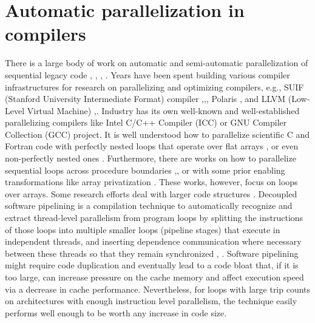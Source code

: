 \section{Automatic parallelization in compilers}
\label{related_work_autopar}
\quad There is a large body of work on automatic and semi-automatic parallelization of sequential legacy code \cite{6813266}, \cite{article12345}, \cite{Bacon:1994:CTH:197405.197406}, \cite{Kennedy:2001:OCM:502981}. Years have been spent building various compiler infrastructures for research on parallelizing \cite{Kennedy:2001:OCM:502981} and optimizing \cite{Muchnick:1998:ACD:286076} compilers, e.g., SUIF (Stanford University Intermediate Format) compiler \cite{546613},\cite{10.5555/891422},\cite{suif_compiler}, Polaris \cite{polaris}, \cite{10.1109/M-PDT.1994.329796} and LLVM (Low-Level Virtual Machine) \cite{llvm-compiler-infrastructure},\cite{Lattner:2004:LCF:977395.977673}. Industry has its own well-known and well-established parallelizing compilers like Intel C/C++ Compiler (ICC) \cite{icc-compiler} or GNU Compiler Collection (GCC) project.\newline\null
\quad It is well understood how to parallelize scientific C and Fortran code with perfectly nested loops that operate over flat arrays \cite{97902}, or even non-perfectly nested ones \cite{10.1145/263699.263719}. Furthermore, there are works on how to parallelize sequential loops across procedure boundaries \cite{10.1145/125826.126055},\cite{10.5555/645671.665383}, or with some prior enabling transformations like array privatization \cite{10.1145/158511.158515}. These works, however, focus on loops over arrays. Some research efforts deal with larger code structures
\cite{1299188}. Decoupled software pipelining is a compilation technique to automatically recognize and extract thread-level parallelism from program loops by splitting the instructions of those loops into multiple smaller loops (pipeline stages) that execute in independent threads, and inserting dependence communication where necessary between these threads so that they remain synchronized \cite{1540952}, \cite{10.1145/1400112.1400113}. Software pipelining might require code duplication and eventually lead to a code bloat that, if it is too large, can increase pressure on the cache memory and affect execution speed via a decrease in cache performance. Nevertheless, for loops with large trip counts on architectures with enough instruction level parallelism, the technique easily performs well enough to be worth any increase in code size.\newline\null
